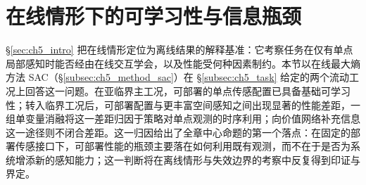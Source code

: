 \section{在线情形下的可学习性与信息瓶颈}\label{sec:ch5_online}

\S\ref{sec:ch5_intro} 把在线情形定位为离线结果的解释基准：它考察任务在仅有单点局部感知时能否经由在线交互学会，以及性能受何种因素制约。本节以在线最大熵方法 SAC（\S\ref{subsec:ch5_method_sac}）在 \S\ref{subsec:ch5_task} 给定的两个流动工况上回答这一问题。在亚临界主工况，可部署的单点传感配置已具备基础可学习性；转入临界工况后，可部署配置与更丰富空间感知之间出现显著的性能差距，一组单变量消融将这一差距归因于策略对单点观测的时序利用；向价值网络补充信息这一途径则不闭合差距。这一归因给出了全章中心命题的第一个落点：在固定的部署传感接口下，可部署性能的瓶颈主要落在如何利用既有观测，而不在于是否为系统增添新的感知能力；这一判断将在离线情形与失效边界的考察中反复得到印证与界定。

